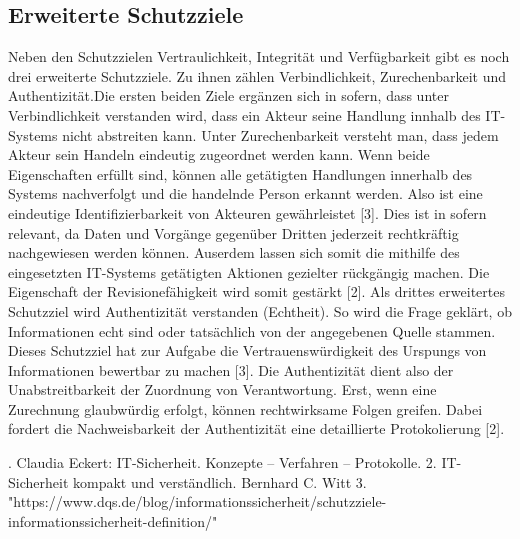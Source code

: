\documentclass[a4paper, 11pt]{article}
\begin{document}
\subsection{Erweiterte Schutzziele}
Neben den Schutzzielen Vertraulichkeit, Integrität und Verfügbarkeit gibt es noch drei erweiterte Schutzziele. Zu ihnen zählen Verbindlichkeit, Zurechenbarkeit und Authentizität.Die ersten beiden Ziele ergänzen sich in sofern, dass unter Verbindlichkeit verstanden wird, dass ein Akteur seine Handlung innhalb des IT-Systems nicht abstreiten kann. Unter Zurechenbarkeit versteht man, dass jedem Akteur sein Handeln eindeutig zugeordnet werden kann. Wenn beide Eigenschaften erfüllt sind, können alle getätigten Handlungen innerhalb des Systems nachverfolgt und die handelnde Person erkannt werden. Also ist eine eindeutige Identifizierbarkeit von Akteuren gewährleistet [3]. Dies ist in sofern relevant, da Daten und Vorgänge gegenüber Dritten jederzeit rechtkräftig nachgewiesen werden können. Auserdem lassen sich somit die mithilfe des eingesetzten IT-Systems getätigten Aktionen gezielter rückgängig machen. Die Eigenschaft der Revisionefähigkeit wird somit gestärkt [2].\newline
Als drittes erweitertes Schutzziel wird Authentizität verstanden (Echtheit). So wird die Frage geklärt, ob Informationen echt sind oder tatsächlich von der angegebenen Quelle stammen. Dieses Schutzziel hat zur Aufgabe die Vertrauenswürdigkeit des Urspungs von Informationen bewertbar zu machen [3]. Die Authentizität dient also der Unabstreitbarkeit der Zuordnung von Verantwortung. Erst, wenn eine Zurechnung glaubwürdig erfolgt, können rechtwirksame Folgen greifen. Dabei fordert die Nachweisbarkeit der Authentizität eine detaillierte Protokolierung [2].



. Claudia Eckert: IT-Sicherheit. Konzepte – Verfahren – Protokolle.
2. IT-Sicherheit kompakt und verständlich. Bernhard C. Witt
3. "https://www.dqs.de/blog/informationssicherheit/schutzziele-informationssicherheit-definition/"
\end{document}
